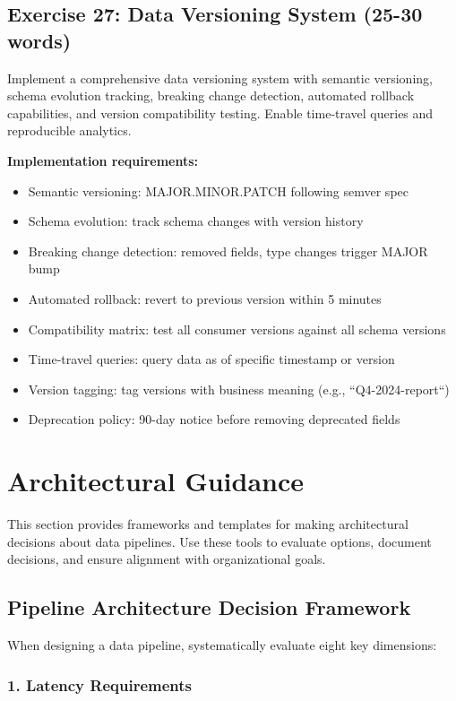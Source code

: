 \subsection{Exercise 27: Data Versioning System (25-30 words)}

Implement a comprehensive data versioning system with semantic versioning, schema evolution tracking, breaking change detection, automated rollback capabilities, and version compatibility testing. Enable time-travel queries and reproducible analytics.

\textbf{Implementation requirements:}
\begin{itemize}
    \item Semantic versioning: MAJOR.MINOR.PATCH following semver spec
    \item Schema evolution: track schema changes with version history
    \item Breaking change detection: removed fields, type changes trigger MAJOR bump
    \item Automated rollback: revert to previous version within 5 minutes
    \item Compatibility matrix: test all consumer versions against all schema versions
    \item Time-travel queries: query data as of specific timestamp or version
    \item Version tagging: tag versions with business meaning (e.g., ``Q4-2024-report``)
    \item Deprecation policy: 90-day notice before removing deprecated fields
\end{itemize}

\section{Architectural Guidance}

This section provides frameworks and templates for making architectural decisions about data pipelines. Use these tools to evaluate options, document decisions, and ensure alignment with organizational goals.

\subsection{Pipeline Architecture Decision Framework}

When designing a data pipeline, systematically evaluate eight key dimensions:

\subsubsection{1. Latency Requirements}

